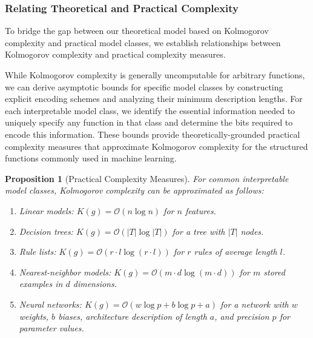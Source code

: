 \documentclass[11pt,letter,leqno]{article}
\newtheorem{proposition}[theorem]{Proposition}
\begin{document}
\subsubsection{Relating Theoretical and Practical Complexity}
\label{subsubsec:practical-complexity}

To bridge the gap between our theoretical model based on Kolmogorov complexity and practical model classes, we establish relationships between Kolmogorov complexity and practical complexity measures.

While Kolmogorov complexity is generally uncomputable for arbitrary functions, we can derive asymptotic bounds for specific model classes by constructing explicit encoding schemes and analyzing their minimum description lengths.  For each interpretable model class, we identify the essential information needed to uniquely specify any function in that class and determine the bits required to encode this information.  These bounds provide theoretically-grounded practical complexity measures that approximate Kolmogorov complexity for the structured functions commonly used in machine learning.

\begin{proposition}[Practical Complexity Measures]
\label{prop:practical-complexity}
For common interpretable model classes, Kolmogorov complexity can be approximated as follows:
\begin{enumerate}
\item Linear models: $K(g) = \mathcal{O}(n \log n)$ for $n$ features.
\item Decision trees: $K(g) = \mathcal{O}(|T| \log |T|)$ for a tree with $|T|$ nodes.
\item Rule lists: $K(g) = \mathcal{O}(r \cdot l \log(r \cdot l))$ for $r$ rules of average length $l$.
\item Nearest-neighbor models: $K(g) = \mathcal{O}(m \cdot d \log(m \cdot d))$ for $m$ stored examples in $d$ dimensions.
\item Neural networks: $K(g) = \mathcal{O}(w \log p + b \log p + a)$ for a network with $w$ weights, $b$ biases, architecture description of length $a$, and precision $p$ for parameter values.
\end{enumerate}
\end{proposition}
\end{document}
